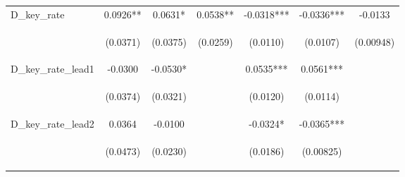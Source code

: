 \documentclass[]{article}
\begin{document}
\begin{center}
\begin{tabular}{lcccccc}
D\_key\_rate & 0.0926** & 0.0631* & 0.0538** & -0.0318*** & -0.0336*** & -0.0133 \\
\vspace{4pt} & \begin{footnotesize}(0.0371)\end{footnotesize} & \begin{footnotesize}(0.0375)\end{footnotesize} & \begin{footnotesize}(0.0259)\end{footnotesize} & \begin{footnotesize}(0.0110)\end{footnotesize} & \begin{footnotesize}(0.0107)\end{footnotesize} & \begin{footnotesize}(0.00948)\end{footnotesize} \\
D\_key\_rate\_lead1 & -0.0300 & -0.0530* &  & 0.0535*** & 0.0561*** &  \\
\vspace{4pt} & \begin{footnotesize}(0.0374)\end{footnotesize} & \begin{footnotesize}(0.0321)\end{footnotesize} & \begin{footnotesize}\end{footnotesize} & \begin{footnotesize}(0.0120)\end{footnotesize} & \begin{footnotesize}(0.0114)\end{footnotesize} & \begin{footnotesize}\end{footnotesize} \\
D\_key\_rate\_lead2 & 0.0364 & -0.0100 &  & -0.0324* & -0.0365*** &  \\
\vspace{4pt} & \begin{footnotesize}(0.0473)\end{footnotesize} & \begin{footnotesize}(0.0230)\end{footnotesize} & \begin{footnotesize}\end{footnotesize} & \begin{footnotesize}(0.0186)\end{footnotesize} & \begin{footnotesize}(0.00825)\end{footnotesize} & \begin{footnotesize}\end{footnotesize} \\

\end{tabular}
\end{center}
\end{document}
